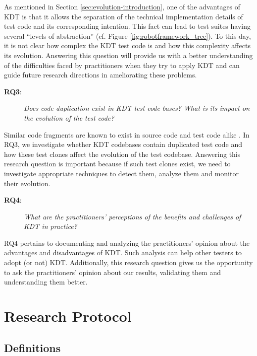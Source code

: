As mentioned in Section \ref{sec:evolution-introduction}, one of the advantages of KDT is that it allows the separation of the technical implementation details of test code and its corresponding intention. This fact can lead to test suites having several ``levels of abstraction'' (cf. Figure \ref{fig:robotframework_tree}). To this day, it is not clear how complex the KDT test code is and how this complexity affects its evolution. Answering this question will provide us with a better understanding of the difficulties faced by practitioners when they try to apply KDT and can guide future research directions in ameliorating these problems.

\begin{description}
\item[\textbf{RQ3}:] \emph{Does code duplication exist in KDT test code bases? What is its impact on the evolution of the test code?}
\end{description}

Similar code fragments are known to exist in source code and test code alike \cite{Baker1995, Roy2009, Rattan2013, Lavoie2017}. In RQ3, we investigate whether KDT codebases contain duplicated test code and how these test clones affect the evolution of the test codebase. Answering this research question is important because if such test clones exist, we need to investigate appropriate techniques to detect them, analyze them and monitor their evolution.

\begin{description}
\item[\textbf{RQ4}:] \emph{What are the practitioners' perceptions of the
    benefits and challenges of KDT in practice?}
\end{description}

RQ4 pertains to documenting and analyzing the practitioners' opinion about the advantages and disadvantages of KDT. Such analysis can help other testers to adopt (or not) KDT. Additionally, this research question gives us the opportunity to ask the practitioners' opinion about our results, validating them and understanding them better.

\section{Research Protocol}

\subsection{Definitions}
\label{sec:evolution-protocol-definitions}

